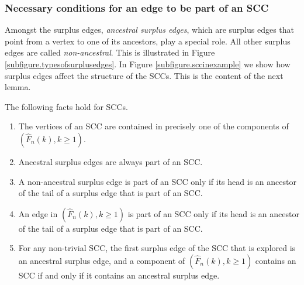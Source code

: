 \subsubsection{Necessary conditions for an edge to be part of an SCC}\label{subsubsec.defcandidates}
Amongst the surplus edges, \emph{ancestral surplus edges}, which are surplus edges that point from a vertex to one of its ancestors, play a special role. All other surplus edges are called \emph{non-ancestral}. This is illustrated in Figure \ref{subfigure.typesofsurplusedges}. In Figure \ref{subfigure.sccinexample} we show how surplus edges affect the structure of the SCCs. This is the content of the next lemma.
\begin{lemma}\label{lemma.whatispartofscc}
The following facts hold for SCCs. 
\begin{enumerate}
\item \label{item.factsonsccs1}The vertices of an SCC are contained in precisely one of the components of {$(\hat{F}_n(k),k\geq 1)$}. 
\item \label{item.factsonsccs2} Ancestral surplus edges are always part of an SCC.
\item \label{item.factsonsccs4} A non-ancestral surplus edge is part of an SCC only if its head is an ancestor of the tail of a surplus edge that is part of an SCC.
\item \label{item.factsonsccs4andabit} An edge in $(\hat{F}_n(k),k\geq 1)$ is part of an SCC only if its head is an ancestor of the tail of a surplus edge that is part of an SCC.
\item \label{item.factsonsccs5} For any non-trivial SCC, the first surplus edge of the SCC that is explored is an ancestral surplus edge, and a component of  $(\hat{F}_n(k),k\geq 1)$ contains an SCC if and only if it contains an ancestral surplus edge.
\end{enumerate}
\end{lemma}
